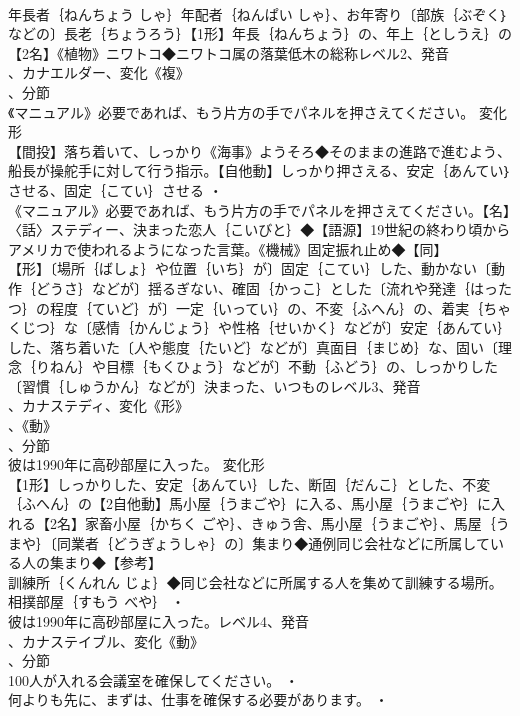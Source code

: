\documentclass[8pt]{extreport}
\begin{document}
\begin{CJK}{UTF8}{min}
\\	年長者｛ねんちょう しゃ｝年配者｛ねんぱい しゃ｝、お年寄り〔部族｛ぶぞく｝などの〕長老｛ちょうろう｝【1形】年長｛ねんちょう｝の、年上｛としうえ｝の【2名】《植物》ニワトコ◆ニワトコ属の落葉低木の総称レベル2、発音
\\	、カナエルダー、変化《複》
\\	、分節
\\	《マニュアル》必要であれば、もう片方の手でパネルを押さえてください。	変化形 
\\	【間投】落ち着いて、しっかり《海事》ようそろ◆そのままの進路で進むよう、船長が操舵手に対して行う指示。【自他動】しっかり押さえる、安定｛あんてい｝させる、固定｛こてい｝させる ・
\\	《マニュアル》必要であれば、もう片方の手でパネルを押さえてください。【名】〈話〉ステディー、決まった恋人｛こいびと｝◆【語源】19世紀の終わり頃からアメリカで使われるようになった言葉。《機械》固定振れ止め◆【同】
\\	【形】〔場所｛ばしょ｝や位置｛いち｝が〕固定｛こてい｝した、動かない〔動作｛どうさ｝などが〕揺るぎない、確固｛かっこ｝とした〔流れや発達｛はったつ｝の程度｛ていど｝が〕一定｛いってい｝の、不変｛ふへん｝の、着実｛ちゃくじつ｝な〔感情｛かんじょう｝や性格｛せいかく｝などが〕安定｛あんてい｝した、落ち着いた〔人や態度｛たいど｝などが〕真面目｛まじめ｝な、固い〔理念｛りねん｝や目標｛もくひょう｝などが〕不動｛ふどう｝の、しっかりした〔習慣｛しゅうかん｝などが〕決まった、いつものレベル3、発音
\\	、カナステディ、変化《形》
\\	、《動》
\\	、分節
\\	彼は1990年に高砂部屋に入った。	変化形 
\\	【1形】しっかりした、安定｛あんてい｝した、断固｛だんこ｝とした、不変｛ふへん｝の【2自他動】馬小屋｛うまごや｝に入る、馬小屋｛うまごや｝に入れる【2名】家畜小屋｛かちく ごや｝、きゅう舎、馬小屋｛うまごや｝、馬屋｛うまや｝〔同業者｛どうぎょうしゃ｝の〕集まり◆通例同じ会社などに所属している人の集まり◆【参考】
\\	訓練所｛くんれん じょ｝◆同じ会社などに所属する人を集めて訓練する場所。相撲部屋｛すもう べや｝ ・
\\	彼は1990年に高砂部屋に入った。レベル4、発音
\\	、カナステイブル、変化《動》
\\	、分節
\\	100人が入れる会議室を確保してください。 ・
\\	何よりも先に、まずは、仕事を確保する必要があります。 ・

\end{CJK}
\end{document}
